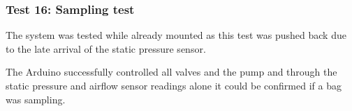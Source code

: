 \documentclass[a4paper,12pt,oneside]{article}
\begin{document}
\begin{appendices}
\subsubsection{Test 16: Sampling test}
The system was tested while already mounted as this test was pushed back due to the late arrival of the static pressure sensor.

The Arduino successfully controlled all valves and the pump and through the static pressure and airflow sensor readings alone it could be confirmed if a bag was sampling.




%
%
%
\end{appendices}

%
%

\restoregeometry
\end{document}
